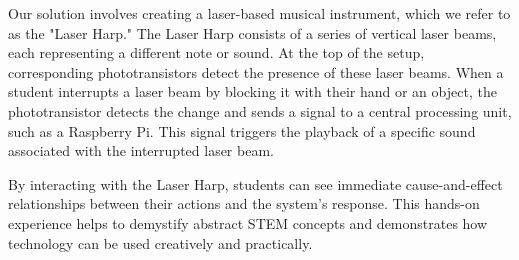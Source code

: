 Our solution involves creating a laser-based musical instrument, which we refer to as the "Laser Harp." The Laser Harp consists of a series of vertical laser beams, each representing a different note or sound. At the top of the setup, corresponding phototransistors detect the presence of these laser beams. When a student interrupts a laser beam by blocking it with their hand or an object, the phototransistor detects the change and sends a signal to a central processing unit, such as a Raspberry Pi. This signal triggers the playback of a specific sound associated with the interrupted laser beam.

By interacting with the Laser Harp, students can see immediate cause-and-effect relationships between their actions and the system's response. This hands-on experience helps to demystify abstract STEM concepts and demonstrates how technology can be used creatively and practically.
